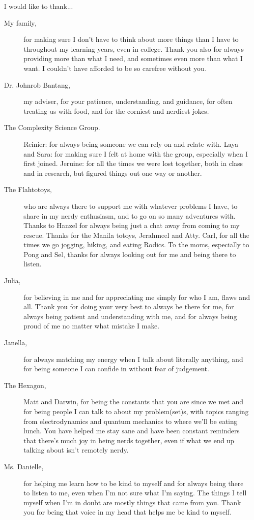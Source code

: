 I would like to thank...
\begin{description}
    \item[My family,] for making sure I don't have to think about more things than I have to throughout my learning years, even in college. Thank you also for always providing more than what I need, and sometimes even more than what I want. I couldn't have afforded to be so carefree without you.
    \item[Dr. Johnrob Bantang,] my adviser, for your patience, understanding, and guidance, for often treating us with food, and for the corniest and nerdiest jokes.
    \item[The Complexity Science Group.] Reinier: for always being someone we can rely on and relate with. Laya and Sara: for making sure I felt at home with the group, especially when I first joined. Jeruine: for all the times we were lost together, both in class and in research, but figured things out one way or another.
    \item[The Flahtotoys,] who are always there to support me with whatever problems I have, to share in my nerdy enthusiasm, and to go on so many adventures with. Thanks to Hanzel for always being just a chat away from coming to my rescue. Thanks for the Manila totoys, Jerahmeel and Atty. Carl, for all the times we go jogging, hiking, and eating Rodics. To the moms, especially to Pong and Sel, thanks for always looking out for me and being there to listen.
    \item[Julia,] for believing in me and for appreciating me simply for who I am, flaws and all. Thank you for doing your very best to always be there for me, for always being patient and understanding with me, and for always being proud of me no matter what mistake I make.
    \item[Janella,] for always matching my energy when I talk about literally anything, and for being someone I can confide in without fear of judgement.
    \item[The Hexagon,] Matt and Darwin, for being the constants that you are since we met and for being people I can talk to about my problem(set)s, with topics ranging from electrodynamics and quantum mechanics to where we'll be eating lunch. You have helped me stay sane and have been constant reminders that there's much joy in being nerds together, even if what we end up talking about isn't remotely nerdy.
    \item[Ms. Danielle,] for helping me learn how to be kind to myself and for always being there to listen to me, even when I'm not sure what I'm saying. The things I tell myself when I'm in doubt are mostly things that came from you. Thank you for being that voice in my head that helps me be kind to myself.

\end{description}
